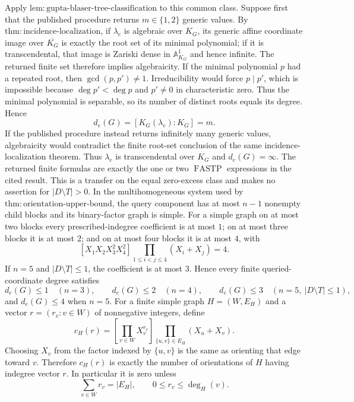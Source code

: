 Apply \(\mathrm{lem:gupta\mbox{-}blaser\mbox{-}tree\mbox{-}classification}\) to this common class. Suppose first that the published procedure returns \(m\in\{1,2\}\) generic values. By \(\mathrm{thm:incidence\mbox{-}localization}\), if \(\lambda_e\) is algebraic over \(K_G\), its generic affine coordinate image over \(\overline{K_G}\) is exactly the root set of its minimal polynomial; if it is transcendental, that image is Zariski dense in \(\mathbb A^1_{K_G}\) and hence infinite. The returned finite set therefore implies algebraicity. If the minimal polynomial \(p\) had a repeated root, then \(\gcd(p,p')\neq1\). Irreducibility would force \(p\mid p'\), which is impossible because \(\deg p'<\deg p\) and \(p'\neq0\) in characteristic zero. Thus the minimal polynomial is separable, so its number of distinct roots equals its degree. Hence
\[
 d_e(G)=[K_G(\lambda_e):K_G]=m.
\]
If the published procedure instead returns infinitely many generic values, algebraicity would contradict the finite root-set conclusion of the same incidence-localization theorem. Thus \(\lambda_e\) is transcendental over \(K_G\) and \(d_e(G)=\infty\). The returned finite formulas are exactly the one or two \(\operatorname{FASTP}\) expressions in the cited result. This is a transfer on the equal zero-excess class and makes no assertion for \(|D\setminus T|>0\).
In the multihomogeneous system used by \(\mathrm{thm:orientation\mbox{-}upper\mbox{-}bound}\), the query component has at most \(n-1\) nonempty child blocks and its binary-factor graph is simple. For a simple graph on at most two blocks every prescribed-indegree coefficient is at most \(1\); on at most three blocks it is at most \(2\); and on at most four blocks it is at most \(4\), with
\[
 [X_1X_2X_3^2X_4^2]\prod_{1\leq i<j\leq4}(X_i+X_j)=4.
\]
If \(n=5\) and \(|D\setminus T|\leq1\), the coefficient is at most \(3\). Hence every finite queried-coordinate degree satisfies
\[
 d_e(G)\leq1\quad(n=3),\qquad
 d_e(G)\leq2\quad(n=4),\qquad
 d_e(G)\leq3\quad(n=5,\ |D\setminus T|\leq1),
\]
and \(d_e(G)\leq4\) when \(n=5\).
For a finite simple graph \(H=(W,E_H)\) and a vector \(r=(r_v:v\in W)\) of nonnegative integers, define
\[
 c_H(r)=\left[\prod_{v\in W}X_v^{r_v}\right]
          \prod_{\{u,v\}\in E_H}(X_u+X_v).
\]
Choosing \(X_v\) from the factor indexed by \(\{u,v\}\) is the same as orienting that edge toward \(v\). Therefore \(c_H(r)\) is exactly the number of orientations of \(H\) having indegree vector \(r\). In particular it is zero unless
\[
 \sum_{v\in W}r_v=|E_H|,
 \qquad 0\leq r_v\leq\deg_H(v).
 \tag{1}
\]

